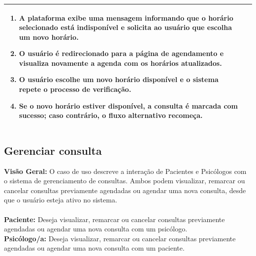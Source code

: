 \documentclass[a4paper,12pt]{report}
\begin{document}
\begin{longtable}{|p{4cm}|p{11.5cm}|}
\begin{enumerate}[left=2mm]
        \item A plataforma exibe uma mensagem informando que o horário selecionado está indisponível e solicita ao usuário que escolha um novo horário.
        \item O usuário é redirecionado para a página de agendamento e visualiza novamente a agenda com os horários atualizados.
        \item O usuário escolhe um novo horário disponível e o sistema repete o processo de verificação.
        \item Se o novo horário estiver disponível, a consulta é marcada com sucesso; caso contrário, o fluxo alternativo recomeça.
    \end{enumerate}
    \\ \hline
    \end{longtable}


\subsection{Gerenciar consulta}
\textbf{Visão Geral:} O caso de uso descreve a interação de Pacientes e Psicólogos com o sistema de gerenciamento de consultas. Ambos podem visualizar, remarcar ou cancelar consultas previamente agendadas ou agendar uma nova consulta, desde que o usuário esteja ativo no sistema.
\\
\\
\textbf{Paciente:} Deseja visualizar, remarcar ou cancelar consultas previamente agendadas ou agendar uma nova consulta com um psicólogo.
\\
\textbf{Psicólogo/a:} Deseja visualizar, remarcar ou cancelar consultas previamente agendadas ou agendar uma nova consulta com um paciente.
\\
\end{document}
